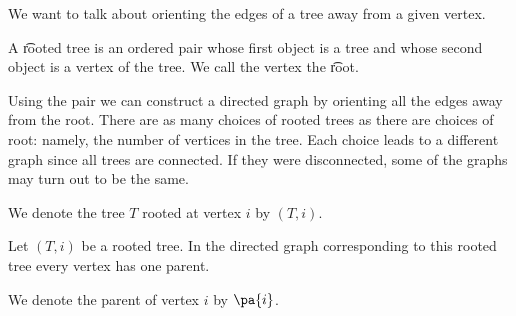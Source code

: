 

We want to talk about orienting the edges of a tree away from a given vertex.


A \t{rooted tree} is an ordered pair whose first object is a tree and whose second object is a vertex of the tree. We call the vertex the \t{root}.

Using the pair we can construct a directed graph by orienting all the edges away from the root.
There are as many choices of rooted trees as there are choices of root: namely, the number of vertices in the tree.
Each choice leads to a different graph since all trees are connected.
If they were disconnected, some of the graphs may turn out to be the same.


We denote the tree $T$ rooted at vertex $i$ by $(T, i)$.


\begin{prop}
Let $(T, i)$ be a rooted tree.
In the directed graph corresponding to this rooted tree every vertex has one parent.
\end{prop}

We denote the parent of vertex $i$ by $\pa{i}$.
